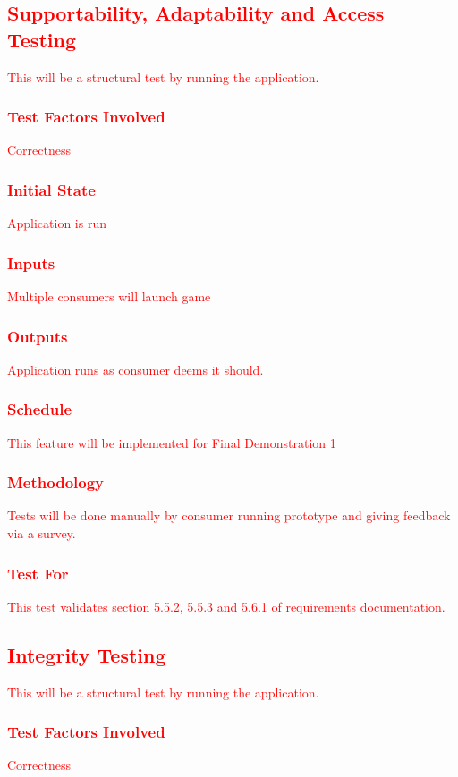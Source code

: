 \documentclass[11pt, oneside]{article}   	%
\begin{document}
\subsection{\textcolor{red}{Supportability, Adaptability and Access Testing}}
\textcolor{red}{This will be a structural test by running the application.}
\subsubsection{\textcolor{red}{Test Factors Involved}}
\textcolor{red}{Correctness}
\subsubsection{\textcolor{red}{Initial State}}
\textcolor{red}{Application is run}
\subsubsection{\textcolor{red}{Inputs}}
\textcolor{red}{Multiple consumers will launch game}
\subsubsection{\textcolor{red}{Outputs}}
\textcolor{red}{Application runs as consumer deems it should.}
\subsubsection{\textcolor{red}{Schedule}}
\textcolor{red}{This feature will be implemented for Final Demonstration 1}
\subsubsection{\textcolor{red}{Methodology}}
\textcolor{red}{Tests will be done manually by consumer running prototype and giving feedback via a survey.}
\subsubsection{\textcolor{red}{Test For}}
\textcolor{red}{This test validates section 5.5.2, 5.5.3 and 5.6.1 of requirements documentation.}


\subsection{\textcolor{red}{Integrity Testing}}
\textcolor{red}{This will be a structural test by running the application.}
\subsubsection{\textcolor{red}{Test Factors Involved}}
\textcolor{red}{Correctness}
\end{document}

